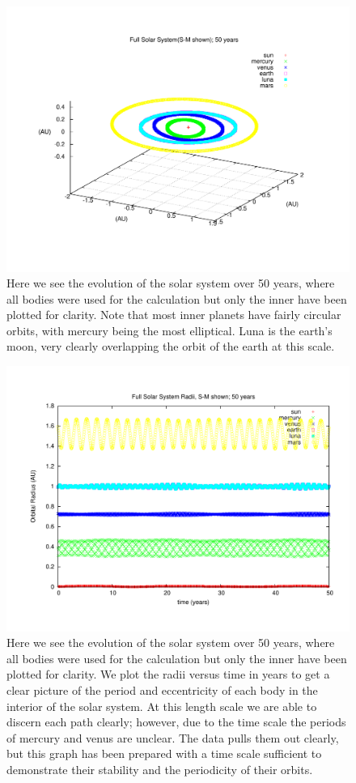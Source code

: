 \documentclass[11pt,a4paper]{article}
\begin{document}
\begin{figure}
\centering
\includegraphics[width=1.0\textwidth]{fullss_s-m_50years.pdf}
\caption{Here we see the evolution of the solar system over 50 years, where all bodies were used for the calculation but only the inner have been plotted for clarity. Note that most inner planets have fairly circular orbits, with mercury being the most elliptical. Luna is the earth's moon, very clearly overlapping the orbit of the earth at this scale.}
\end{figure}
\begin{figure}
\centering
\includegraphics[width=1.0\textwidth]{fullss_radii_s-m_50years.pdf}
\caption{Here we see the evolution of the solar system over 50 years, where all bodies were used for the calculation but only the inner have been plotted for clarity. We plot the radii versus time in years to get a clear picture of the period and eccentricity of each body in the interior of the solar system. At this length scale we are able to discern each path clearly; however, due to the time scale the periods of mercury and venus are unclear. The data pulls them out clearly, but this graph has been prepared with a time scale sufficient to demonstrate their stability and the periodicity of their orbits.}
\end{figure}
\end{document}
